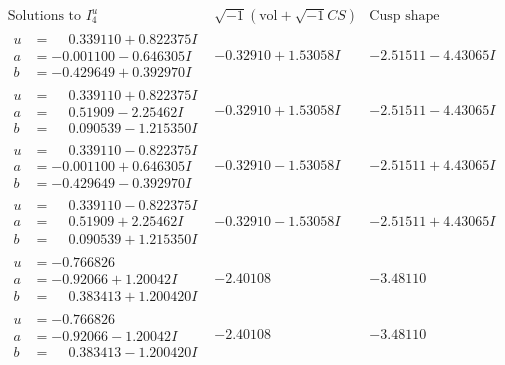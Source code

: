 \documentclass[1p]{elsarticle_modified}
\theoremstyle{definition}
\newcommand{\I}{\sqrt{-1}}
\begin{document}
$$\begin{array}{c|c|c}  
\text{Solutions to }I^u_{4}& \I (\text{vol} + \sqrt{-1}CS) & \text{Cusp shape}\\
 \hline 
\begin{aligned}
u &= \phantom{-}0.339110 + 0.822375 I \\
a &= -0.001100 - 0.646305 I \\
b &= -0.429649 + 0.392970 I\end{aligned}
 & -0.32910 + 1.53058 I & -2.51511 - 4.43065 I \\ \hline\begin{aligned}
u &= \phantom{-}0.339110 + 0.822375 I \\
a &= \phantom{-}0.51909 - 2.25462 I \\
b &= \phantom{-}0.090539 - 1.215350 I\end{aligned}
 & -0.32910 + 1.53058 I & -2.51511 - 4.43065 I \\ \hline\begin{aligned}
u &= \phantom{-}0.339110 - 0.822375 I \\
a &= -0.001100 + 0.646305 I \\
b &= -0.429649 - 0.392970 I\end{aligned}
 & -0.32910 - 1.53058 I & -2.51511 + 4.43065 I \\ \hline\begin{aligned}
u &= \phantom{-}0.339110 - 0.822375 I \\
a &= \phantom{-}0.51909 + 2.25462 I \\
b &= \phantom{-}0.090539 + 1.215350 I\end{aligned}
 & -0.32910 - 1.53058 I & -2.51511 + 4.43065 I \\ \hline\begin{aligned}
u &= -0.766826\phantom{ +0.000000I} \\
a &= -0.92066 + 1.20042 I \\
b &= \phantom{-}0.383413 + 1.200420 I\end{aligned}
 & -2.40108\phantom{ +0.000000I} & -3.48110\phantom{ +0.000000I} \\ \hline\begin{aligned}
u &= -0.766826\phantom{ +0.000000I} \\
a &= -0.92066 - 1.20042 I \\
b &= \phantom{-}0.383413 - 1.200420 I\end{aligned}
 & -2.40108\phantom{ +0.000000I} & -3.48110\phantom{ +0.000000I} \\ \hline\begin{aligned}

\end{aligned}
\end{array}$$
\end{document}
